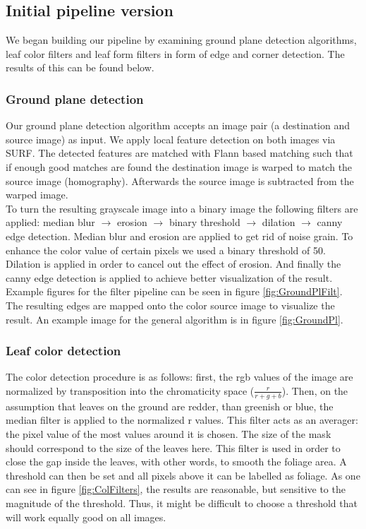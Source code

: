 \documentclass[fleqn,10pt]{SelfArx} %
\begin{document}
\subsection{Initial pipeline version}

We began building our pipeline by examining ground plane detection algorithms, leaf color filters and leaf form filters in form of edge and corner detection. The results of this can be found below.

\subsubsection{Ground plane detection}

Our ground plane detection algorithm accepts an image pair (a destination and source image) as input. We apply local feature detection on both images via SURF. The detected features are matched with Flann based matching such that if enough good matches are found the destination image is warped to match the source image (homography). Afterwards the source image is subtracted from the warped image. \\
To turn the resulting grayscale image into a binary image the following filters are applied: median blur $\rightarrow $ erosion $\rightarrow $ binary threshold $\rightarrow$ dilation $\rightarrow $ canny edge detection. Median blur and erosion are applied to get rid of noise grain. To enhance the color value of certain pixels we used a binary threshold of 50. Dilation is applied in order to cancel out the effect of erosion. And finally the canny edge detection is applied to achieve better visualization of the result. Example figures for the filter pipeline can be seen in figure \ref{fig:GroundPlFilt}. \\
 The resulting edges are mapped onto the color source image to visualize the result. An example image for the general algorithm is in figure \ref{fig:GroundPl}.\\

\subsubsection{Leaf color detection} 
 
The color detection procedure is as follows: first, the rgb values of the image are normalized by transposition into the chromaticity space ($\frac{r}{r+g+b}$). Then, on the assumption that leaves on the ground are redder, than greenish or blue, the median filter is applied to the normalized r values. This filter acts as an averager: the pixel value of the most values around it is chosen. The size of the mask should correspond to the size of the leaves here. This filter is used in order to close the gap inside the leaves, with other words, to smooth the foliage area. A threshold can then be set and all pixels above it can be labelled as foliage. As one can see in figure \ref{fig:ColFilters}, the results are reasonable, but sensitive to the magnitude of the threshold. Thus, it might be difficult to choose a threshold that will work equally good on all images.
\end{document}

